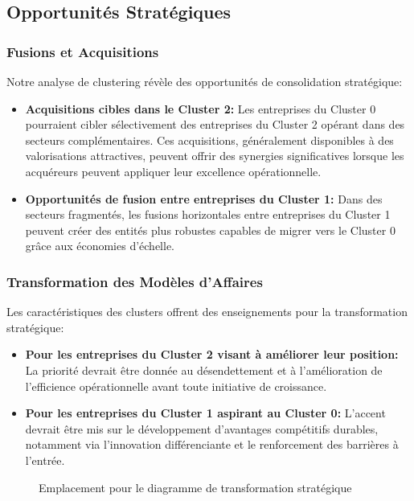 \subsection{Opportunités Stratégiques}
\subsubsection{Fusions et Acquisitions}
Notre analyse de clustering révèle des opportunités de consolidation stratégique:

\begin{itemize}
    \item \textbf{Acquisitions cibles dans le Cluster 2:} Les entreprises du Cluster 0 pourraient cibler sélectivement des entreprises du Cluster 2 opérant dans des secteurs complémentaires. Ces acquisitions, généralement disponibles à des valorisations attractives, peuvent offrir des synergies significatives lorsque les acquéreurs peuvent appliquer leur excellence opérationnelle.
    
    \item \textbf{Opportunités de fusion entre entreprises du Cluster 1:} Dans des secteurs fragmentés, les fusions horizontales entre entreprises du Cluster 1 peuvent créer des entités plus robustes capables de migrer vers le Cluster 0 grâce aux économies d'échelle.
\end{itemize}

\subsubsection{Transformation des Modèles d'Affaires}
Les caractéristiques des clusters offrent des enseignements pour la transformation stratégique:

\begin{itemize}
    \item \textbf{Pour les entreprises du Cluster 2 visant à améliorer leur position:} La priorité devrait être donnée au désendettement et à l'amélioration de l'efficience opérationnelle avant toute initiative de croissance.
    
    \item \textbf{Pour les entreprises du Cluster 1 aspirant au Cluster 0:} L'accent devrait être mis sur le développement d'avantages compétitifs durables, notamment via l'innovation différenciante et le renforcement des barrières à l'entrée.
\end{itemize}

\begin{figure}[H]
    \centering
    \caption{Emplacement pour le diagramme de transformation stratégique}
    \label{fig:transformation}
\end{figure}

